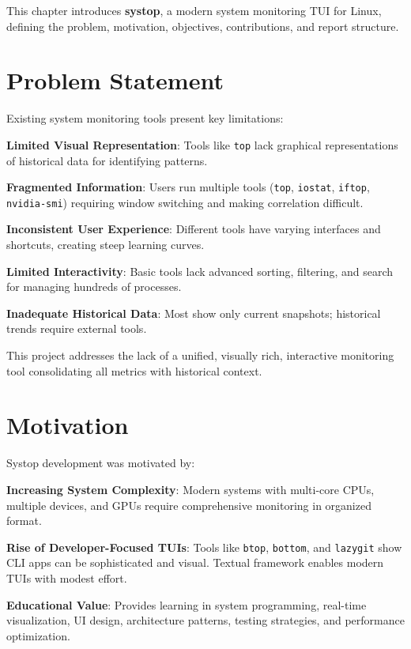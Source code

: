 \documentclass[12pt,a4paper,oneside]{report}
\begin{document}
This chapter introduces \textbf{systop}, a modern system monitoring TUI for Linux, defining the problem, motivation, objectives, contributions, and report structure.

\section{Problem Statement}
\label{sec:problem-statement}

Existing system monitoring tools present key limitations:

\textbf{Limited Visual Representation}: Tools like \texttt{top} lack graphical representations of historical data for identifying patterns.

\textbf{Fragmented Information}: Users run multiple tools (\texttt{top}, \texttt{iostat}, \texttt{iftop}, \texttt{nvidia-smi}) requiring window switching and making correlation difficult.

\textbf{Inconsistent User Experience}: Different tools have varying interfaces and shortcuts, creating steep learning curves.

\textbf{Limited Interactivity}: Basic tools lack advanced sorting, filtering, and search for managing hundreds of processes.

\textbf{Inadequate Historical Data}: Most show only current snapshots; historical trends require external tools.

This project addresses the lack of a unified, visually rich, interactive monitoring tool consolidating all metrics with historical context.

\section{Motivation}
\label{sec:motivation}

Systop development was motivated by:

\textbf{Increasing System Complexity}: Modern systems with multi-core CPUs, multiple devices, and GPUs require comprehensive monitoring in organized format.

\textbf{Rise of Developer-Focused TUIs}: Tools like \texttt{btop}, \texttt{bottom}, and \texttt{lazygit} show CLI apps can be sophisticated and visual. Textual framework enables modern TUIs with modest effort.

\textbf{Educational Value}: Provides learning in system programming, real-time visualization, UI design, architecture patterns, testing strategies, and performance optimization.
\end{document}
